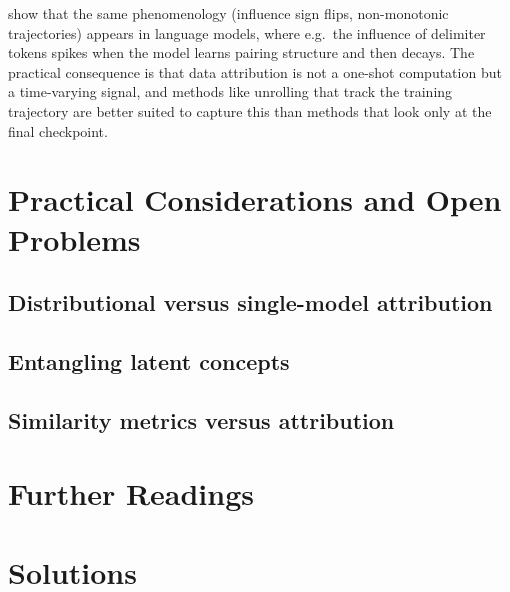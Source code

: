 \documentclass[11pt]{article}
\begin{document}
\begin{remark}\label{rem:developmental}
  \citet{lee2025stagewise} show that the same phenomenology (influence sign flips, non-monotonic trajectories) appears in language models, where e.g.\ the influence of delimiter tokens spikes when the model learns pairing structure and then decays. The practical consequence is that data attribution is not a one-shot computation but a time-varying signal, and methods like unrolling that track the training trajectory are better suited to capture this than methods that look only at the final checkpoint.
\end{remark}

\section{Practical Considerations and Open Problems}\label{sec:practical}

\subsection{Distributional versus single-model attribution}

\subsection{Entangling latent concepts}

\subsection{Similarity metrics versus attribution}

\section{Further Readings}\label{sec:further}

\section*{Solutions}









\end{document}
